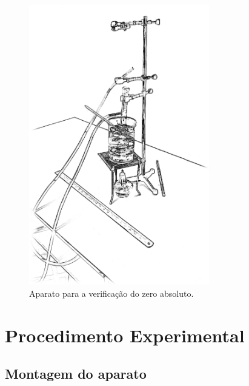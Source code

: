 \begin{figure}[!h]
\centering
\forceversofloat
\includegraphics[width=0.7\textwidth]{Ilustrations/AparatoZeroAbs.png}
\caption{Aparato para a verificação do zero absoluto.}
\end{figure}
\section{Procedimento Experimental}

\subsection{Montagem do aparato}

